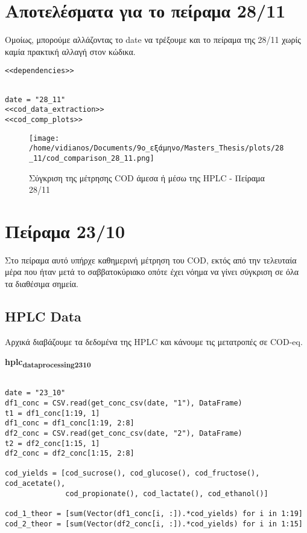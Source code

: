 \documentclass[11pt]{article}
\begin{document}
\section{Αποτελέσματα για το πείραμα 28/11}
\label{sec:orgf12165a}
Ομοίως, μπορούμε αλλάζοντας το date να τρέξουμε και το πείραμα της 28/11 χωρίς καμία πρακτική αλλαγή στον κώδικα.

\begin{verbatim}
<<dependencies>>
\end{verbatim}

\begin{verbatim}

date = "28_11"
<<cod_data_extraction>>
<<cod_comp_plots>>

\end{verbatim}

\begin{figure}[htbp]
\centering
\texttt{[image: /home/vidianos/Documents/9o\_εξάμηνο/Masters\_Thesis/plots/28\_11/cod\_comparison\_28\_11.png]}
\caption{Σύγκριση της μέτρησης COD άμεσα ή μέσω της HPLC - Πείραμα 28/11}
\end{figure}

\section{Πείραμα 23/10}
\label{sec:org8a0a4e3}
Στο πείραμα αυτό υπήρχε καθημερινή μέτρηση του COD, εκτός από την τελευταία μέρα που ήταν μετά το σαββατοκύριακο οπότε έχει νόημα να γίνει σύγκριση σε όλα τα διαθέσιμα σημεία.

\subsection{HPLC Data}
\label{sec:orgdbc83f5}
Αρχικά διαβάζουμε τα δεδομένα της HPLC και κάνουμε τις μετατροπές σε COD-eq.

\textbf{hplc\textsubscript{data}\textsubscript{processing}\textsubscript{23}\textsubscript{10}}
\begin{verbatim}

date = "23_10"
df1_conc = CSV.read(get_conc_csv(date, "1"), DataFrame)
t1 = df1_conc[1:19, 1]
df1_conc = df1_conc[1:19, 2:8]
df2_conc = CSV.read(get_conc_csv(date, "2"), DataFrame)
t2 = df2_conc[1:15, 1]
df2_conc = df2_conc[1:15, 2:8]

cod_yields = [cod_sucrose(), cod_glucose(), cod_fructose(), cod_acetate(),
              cod_propionate(), cod_lactate(), cod_ethanol()]

cod_1_theor = [sum(Vector(df1_conc[i, :]).*cod_yields) for i in 1:19]
cod_2_theor = [sum(Vector(df2_conc[i, :]).*cod_yields) for i in 1:15]

\end{verbatim}
\end{document}
